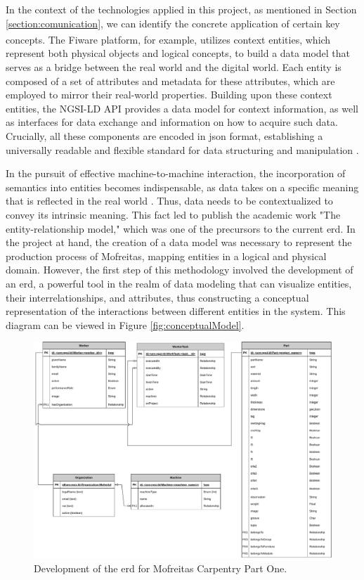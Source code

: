 In the context of the technologies applied in this project, as mentioned in Section \ref{section:comunication}, we can identify the concrete application of certain key concepts. The Fiware\textsuperscript{\textregistered} platform, for example, utilizes context entities, which represent both physical objects and logical concepts, to build a data model that serves as a bridge between the real world and the digital world. Each entity is composed of a set of attributes and metadata for these attributes, which are employed to mirror their real-world properties. Building upon these context entities, the NGSI-LD API provides a data model for context information, as well as interfaces for data exchange and information on how to acquire such data. Crucially, all these components are encoded in \gls{json} format, establishing a universally readable and flexible standard for data structuring and manipulation \cite{etsi2023}.

In the pursuit of effective machine-to-machine interaction, the incorporation of semantics into entities becomes indispensable, as data takes on a specific meaning that is reflected in the real world \cite{Li2009}. Thus, data needs to be contextualized to convey its intrinsic meaning. This fact led \textcite{Chen1976} to publish the academic work "The entity-relationship model," which was one of the precursors to the current \acrfull{erd}. In the project at hand, the creation of a data model was necessary to represent the production process of Mofreitas, mapping entities in a logical and physical domain. However, the first step of this methodology involved the development of an \acrshort{erd}, a powerful tool in the realm of data modeling that can visualize entities, their interrelationships, and attributes, thus constructing a conceptual representation of the interactions between different entities in the system. This diagram can be viewed in Figure \ref{fig:conceptualModel}.

\begin{figure}[!ht]
    \centering
    \includegraphics[width=.65\linewidth]{images/Development/chap3/WoodWork- Part 1.pdf}
    \caption{Development of the \acrfull{erd} for Mofreitas Carpentry Part One.}
    \label{fig:conceptualModel-part1}
\end{figure}


